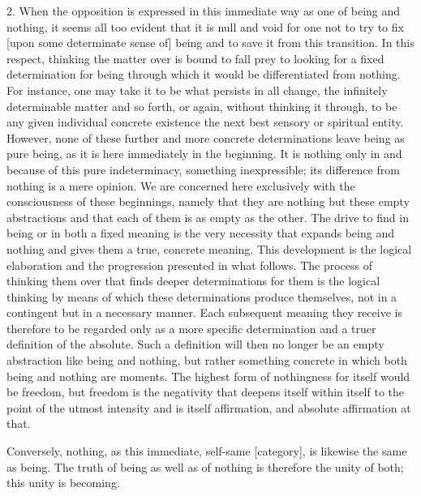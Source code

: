 2. When the opposition is expressed in this immediate way
as one of being and nothing, it seems all too evident
that it is null and void for one not to try to fix
[upon some determinate sense of] being and
to save it from this transition.
In this respect, thinking the matter over is bound
to fall prey to looking for a fixed determination for being
through which it would be differentiated from nothing.
For instance, one may take it to be what persists in all change,
the infinitely determinable matter and so forth,
or again, without thinking it through, to be
any given individual concrete existence
the next best sensory or spiritual entity.
However, none of these further and more concrete determinations
leave being as pure being, as it is here immediately in the beginning.
It is nothing only in and because of this pure indeterminacy,
something inexpressible;
its difference from nothing is a mere opinion.
We are concerned here exclusively with the
consciousness of these beginnings,
namely that they are nothing but these empty abstractions and
that each of them is as empty as the other.
The drive to find in being or in both a fixed meaning is
the very necessity that expands being and nothing and
gives them a true, concrete meaning.
This development is the logical elaboration and
the progression presented in what follows.
The process of thinking them over that finds
deeper determinations for them is the logical thinking
by means of which these determinations produce themselves,
not in a contingent but in a necessary manner.
Each subsequent meaning they receive is therefore
to be regarded only as a more specific determination and
a truer definition of the absolute.
Such a definition will then no longer be an empty abstraction
like being and nothing, but rather something concrete in which
both being and nothing are moments.
The highest form of nothingness for itself would be freedom,
but freedom is the negativity that deepens itself within itself
to the point of the utmost intensity and is itself affirmation,
and absolute affirmation at that.

Conversely, nothing, as this immediate, self-same [category],
is likewise the same as being.
The truth of being as well as of nothing is
therefore the unity of both;
this unity is becoming.

